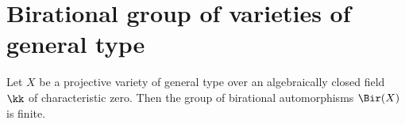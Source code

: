 \section{Birational group of varieties of general type}

    \begin{theorem}\label{thm:birational_group_of_varieties_of_general_type}
        Let \(X\) be a projective variety of general type over an algebraically closed field \(\kk\) of characteristic zero. 
        Then the group of birational automorphisms \(\Bir(X)\) is finite.
    \end{theorem}
